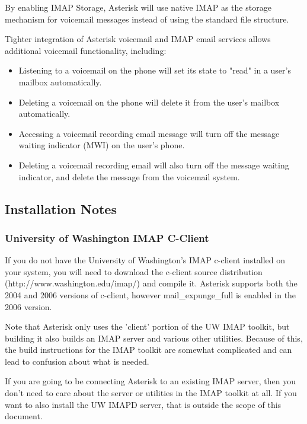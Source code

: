 By enabling IMAP Storage,  Asterisk will use native IMAP as the storage
mechanism for voicemail messages instead of using the standard file structure.

Tighter integration of Asterisk voicemail and IMAP email services allows
additional voicemail functionality, including:

\begin{itemize}
 \item Listening to a voicemail on the phone will set its state to "read" in
   a user's mailbox automatically.
 \item Deleting a voicemail on the phone will delete it from the user's
   mailbox automatically.
 \item Accessing a voicemail recording email message will turn off the message
   waiting indicator (MWI) on the user's phone.
 \item Deleting a voicemail recording email will also turn off the message 
   waiting indicator, and delete the message from the voicemail system.
\end{itemize}

\subsection{Installation Notes}

\subsubsection{University of Washington IMAP C-Client}

If you do not have the University of Washington's IMAP c-client
installed on your system, you will need to download the c-client
source distribution (http://www.washington.edu/imap/) and compile it.
Asterisk supports both the 2004 and 2006 versions of c-client, however
mail\_expunge\_full is enabled in the 2006 version.

Note that Asterisk only uses the 'client' portion of the UW IMAP toolkit,
but building it also builds an IMAP server and various other utilities.
Because of this, the build instructions for the IMAP toolkit are somewhat
complicated and can lead to confusion about what is needed.

If you are going to be connecting Asterisk to an existing IMAP server,
then you don't need to care about the server or utilities in the IMAP
toolkit at all. If you want to also install the UW IMAPD server, that
is outside the scope of this document.

